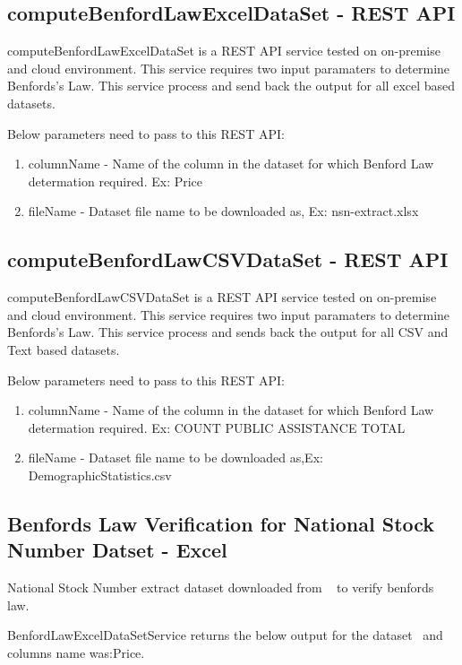 \subsection{computeBenfordLawExcelDataSet - REST API}
computeBenfordLawExcelDataSet is a REST API service tested on 
on-premise and cloud environment. This service requires two 
input paramaters to determine Benfords's Law. This service
process and send back the output 
for all excel based datasets.

Below parameters need to pass to this REST API:

\begin{enumerate}
\item columnName - Name of the column in the 
 dataset for which Benford Law determation required. 
 Ex: Price
\item fileName - Dataset file name to be downloaded 
 as, Ex: nsn-extract.xlsx
\end{enumerate}

\subsection{computeBenfordLawCSVDataSet - REST API}
computeBenfordLawCSVDataSet is a REST API service 
tested on on-premise and cloud environment. 
This service requires two input paramaters to 
determine Benfords's Law. This service
process and sends back the output 
for all CSV and Text based datasets.

Below parameters need to pass to this REST API:

\begin{enumerate}
\item columnName - Name of the column in the 
 dataset for which Benford Law determation required. 
 Ex: COUNT PUBLIC ASSISTANCE TOTAL
\item fileName - Dataset file name to be downloaded 
 as,Ex: DemographicStatistics.csv
\end{enumerate}

\subsection{Benfords Law Verification for National Stock 
Number Datset - Excel}
National Stock Number extract dataset downloaded from 
~\cite{hid-sp18-514-nsn-ds-desc} to verify benfords law.

BenfordLawExcelDataSetService returns the below
output for the dataset~\cite{hid-sp18-514-excelDatalocation}
and columns name was:Price.

